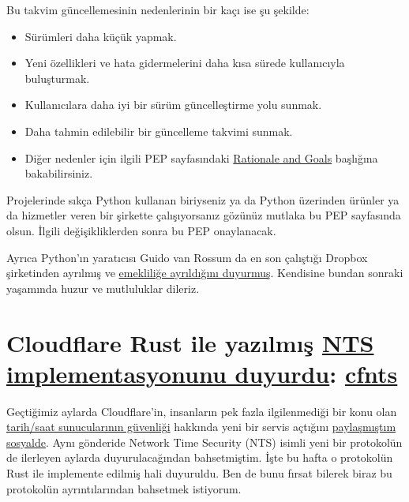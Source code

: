 \documentclass[11pt]{article}
\begin{document}
Bu takvim güncellemesinin nedenlerinin bir kaçı ise şu şekilde:
\begin{itemize}
\item Sürümleri daha küçük yapmak.
\item Yeni özellikleri ve hata gidermelerini daha kısa sürede kullanıcıyla
buluşturmak.
\item Kullanıcılara daha iyi bir sürüm güncelleştirme yolu sunmak.
\item Daha tahmin edilebilir bir güncelleme takvimi sunmak.
\item Diğer nedenler için ilgili PEP sayfasındaki \href{https://www.python.org/dev/peps/pep-0602/\#id12}{Rationale and Goals} başlığına
bakabilirsiniz.
\end{itemize}

Projelerinde sıkça Python kullanan biriyseniz ya da Python üzerinden ürünler ya
da hizmetler veren bir şirkette çalışıyorsanız gözünüz mutlaka bu PEP
sayfasında olsun. İlgili değişikliklerden sonra bu PEP onaylanacak.

Ayrıca Python'ın yaratıcısı Guido van Rossum da en son çalıştığı Dropbox
şirketinden ayrılmış ve \href{https://www.zdnet.com/article/python-programming-language-creator-retires-saying-its-been-an-amazing-ride/}{emekliliğe ayrıldığını duyurmuş}. Kendisine bundan
sonraki yaşamında huzur ve mutluluklar dileriz.
\section{Cloudflare Rust ile yazılmış \href{https://blog.cloudflare.com/announcing-cfnts/}{NTS implementasyonunu duyurdu}: \href{https://github.com/cloudflare/cfnts}{cfnts}}
\label{sec:orgfeef861}
Geçtiğimiz aylarda Cloudflare'in, insanların pek fazla ilgilenmediği bir konu
olan \href{https://blog.cloudflare.com/secure-time/}{tarih/saat sunucularının güvenliği} hakkında yeni bir servis açtığını
\href{https://teknoseyir.com/durum/1105646}{paylaşmıştım sosyalde}. Aynı gönderide Network Time Security (NTS) isimli yeni
bir protokolün de ilerleyen aylarda duyurulacağından bahsetmiştim. İşte bu
hafta o protokolün Rust ile implemente edilmiş hali duyuruldu. Ben de bunu
fırsat bilerek biraz bu protokolün ayrıntılarından bahsetmek istiyorum.
\end{document}
